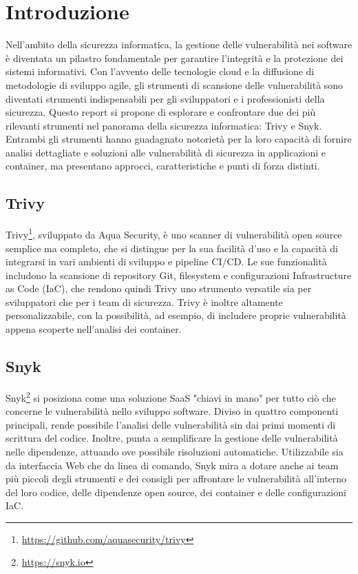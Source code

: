 \chapter{Introduzione}
Nell'ambito della sicurezza informatica, la gestione delle vulnerabilità nei software è diventata un pilastro fondamentale per garantire l'integrità e la protezione dei sistemi informativi. Con l'avvento delle tecnologie cloud e la diffusione di metodologie di sviluppo agile, gli strumenti di scansione delle vulnerabilità sono diventati strumenti indispensabili per gli sviluppatori e i professionisti della sicurezza. Questo report si propone di esplorare e confrontare due dei più rilevanti strumenti nel panorama della sicurezza informatica: Trivy e Snyk. Entrambi gli strumenti hanno guadagnato notorietà per la loro capacità di fornire analisi dettagliate e soluzioni alle vulnerabilità di sicurezza in applicazioni e container, ma presentano approcci, caratteristiche e punti di forza distinti.

\section*{Trivy}

Trivy\footnote{\url{https://github.com/aquasecurity/trivy}}, sviluppato da Aqua Security, è uno scanner di vulnerabilità open source semplice ma completo, che si distingue per la sua facilità d'uso e la capacità di integrarsi in vari ambienti di sviluppo e pipeline CI/CD. Le sue funzionalità includono la scansione di repository Git, filesystem e configurazioni Infrastructure as Code (IaC), che rendono quindi Trivy uno strumento versatile sia per sviluppatori che per i team di sicurezza. Trivy è inoltre altamente personalizzabile, con la possibilità, ad esempio, di includere proprie vulnerabilità appena scoperte nell'analisi dei container.

\section*{Snyk}

Snyk\footnote{\url{https://snyk.io}} si posiziona come una soluzione SaaS "chiavi in mano" per tutto ciò che concerne le vulnerabilità nello sviluppo software. Diviso in quattro componenti principali, rende possibile l'analisi delle vulnerabilità sin dai primi momenti di scrittura del codice. Inoltre, punta a semplificare la gestione delle vulnerabilità nelle dipendenze, attuando ove possibile risoluzioni automatiche. Utilizzabile sia da interfaccia Web che da linea di comando, Snyk mira a dotare anche ai team più piccoli degli strumenti e dei consigli per affrontare le vulnerabilità all'interno del loro codice, delle dipendenze open source, dei container e delle configurazioni IaC.

